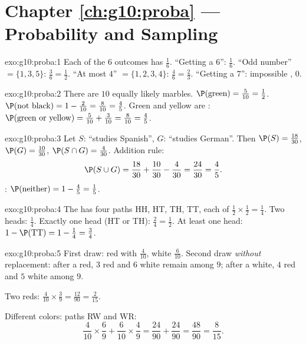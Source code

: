 \section*{Chapter \ref{ch:g10:proba} --- Probability and Sampling}

\begin{solution}{exo:g10:proba:1}
Each of the $6$ outcomes has  $\frac16$.
``Getting a $6$'': $\frac16$.
``Odd number'' $= \{1, 3, 5\}$: $\frac36 = \frac12$.
``At most $4$'' $= \{1,2,3,4\}$: $\frac46 = \frac23$.
``Getting a $7$'': impossible ,  $0$.
\end{solution}

\begin{solution}{exo:g10:proba:2}
There are $10$ equally likely marbles.
$\P(\text{green}) = \frac{5}{10} = \frac12$.
$\P(\text{not black}) = 1 - \frac{2}{10} = \frac{8}{10} = \frac45$.
Green and yellow are :
$\P(\text{green or yellow}) = \frac{5}{10} + \frac{3}{10} = \frac{8}{10}
= \frac45$.
\end{solution}

\begin{solution}{exo:g10:proba:3}
Let $S$: ``studies Spanish'', $G$: ``studies German''. Then
$\P(S) = \frac{18}{30}$, $\P(G) = \frac{10}{30}$,
$\P(S \cap G) = \frac{4}{30}$. Addition rule:
\[
\P(S \cup G) = \frac{18}{30} + \frac{10}{30} - \frac{4}{30}
= \frac{24}{30} = \frac45 .
\]
: $\P(\text{neither}) = 1 - \frac45 = \frac15$.
\end{solution}

\begin{solution}{exo:g10:proba:4}
The  has four paths HH, HT, TH, TT, each of 
$\frac12 \times \frac12 = \frac14$.
Two heads: $\frac14$. Exactly one head (HT or TH): $\frac24 = \frac12$.
At least one head: $1 - \P(\text{TT}) = 1 - \frac14 = \frac34$.
\end{solution}

\begin{solution}{exo:g10:proba:5}
First draw: red with  $\frac{4}{10}$, white $\frac{6}{10}$.
Second draw \emph{without} replacement: after a red, $3$ red and $6$
white remain among $9$; after a white, $4$ red and $5$ white among $9$.

Two reds: $\frac{4}{10} \times \frac39 = \frac{12}{90} = \frac{2}{15}$.

Different colors: paths RW and WR:
\[
\frac{4}{10} \times \frac69 + \frac{6}{10} \times \frac49
= \frac{24}{90} + \frac{24}{90} = \frac{48}{90} = \frac{8}{15}.
\]
\end{solution}

